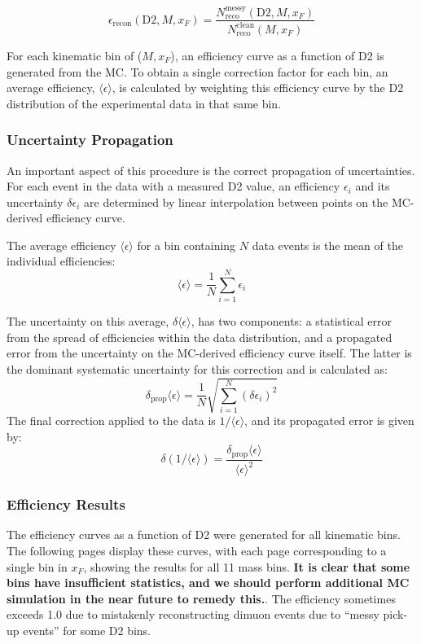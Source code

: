 \documentclass[11pt]{article}
\begin{document}
\begin{equation}
    \epsilon_{\text{recon}}(\text{D2}, M, x_F) = \frac{N_{\text{reco}}^{\text{messy}}(\text{D2}, M, x_F)}{N_{\text{reco}}^{\text{clean}}(M, x_F)}
\end{equation}

For each kinematic bin of ($M, x_F$), an efficiency curve as a function of D2 is generated from the MC. To obtain a single correction factor for each bin, an average efficiency, $\langle \epsilon \rangle$, is calculated by weighting this efficiency curve by the D2 distribution of the experimental data in that same bin.

\subsubsection{Uncertainty Propagation}
An important aspect of this procedure is the correct propagation of uncertainties. For each event in the data with a measured D2 value, an efficiency $\epsilon_{i}$ and its uncertainty $\delta\epsilon_{i}$ are determined by linear interpolation between points on the MC-derived efficiency curve.

The average efficiency $\langle\epsilon\rangle$ for a bin containing $N$ data events is the mean of the individual efficiencies:
\begin{equation} \label{eq:avg_eff_2}
    \langle\epsilon\rangle = \frac{1}{N} \sum_{i=1}^{N} \epsilon_i
\end{equation}

The uncertainty on this average, $\delta\langle\epsilon\rangle$, has two components: a statistical error from the spread of efficiencies within the data distribution, and a propagated error from the uncertainty on the MC-derived efficiency curve itself. The latter is the dominant systematic uncertainty for this correction and is calculated as:
\begin{equation} \label{eq:prop_err_2}
    \delta_{\text{prop}} \langle\epsilon\rangle = \frac{1}{N} \sqrt{\sum_{i=1}^{N} (\delta\epsilon_i)^2}
\end{equation}
The final correction applied to the data is $1/\langle\epsilon\rangle$, and its propagated error is given by:
\begin{equation} \label{eq:inv_err_2}
    \delta(1/\langle\epsilon\rangle) = \frac{\delta_{\text{prop}}\langle\epsilon\rangle}{\langle\epsilon\rangle^2}
\end{equation}

\subsubsection{Efficiency Results}
The efficiency curves as a function of D2 were generated for all kinematic bins. The following pages display these curves, with each page corresponding to a single bin in $x_F$, showing the results for all 11 mass bins.  {\bf It is clear that some bins have insufficient statistics, and we should perform additional MC simulation in the near future to remedy this.}. The efficiency sometimes exceeds 1.0 due to mistakenly reconstructing dimuon events due to ``messy pick-up events'' for some D2 bins.
\end{document}
